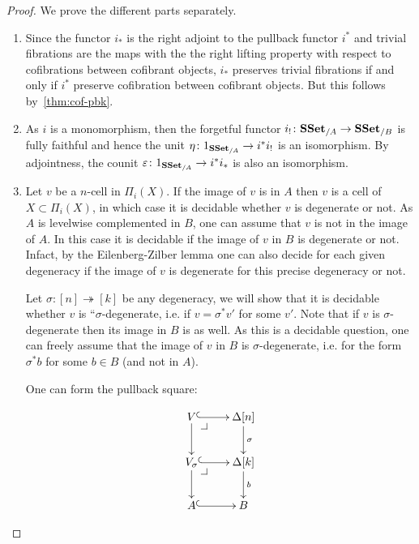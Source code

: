 \documentclass[reqno,10pt,a4paper,oneside,draft]{amsart}
\begin{document}
 
\begin{proof} We prove the different parts separately. 
\begin{enumerate}[$(i)$] 
\item 

Since the functor $i_*$ is the right adjoint to the pullback functor $i^*$ and trivial fibrations are the maps with the the right lifting property with respect to cofibrations between cofibrant objects, $i_*$ preserves trivial fibrations if and only if $i^*$ preserve cofibration between cofibrant objects. But this follows by~\cref{thm:cof-pbk}.

\item As $i$ is a monomorphism, then the forgetful functor $i_{!} \colon \mathbf{SSet}_{/A} \rightarrow \mathbf{SSet}_{/B}$ is fully faithful and hence the unit $\eta \colon 1_{\mathbf{SSet}_{/A}} \rightarrow i^* i_{!}$ is an isomorphism. By adjointness, the counit $\varepsilon \colon 1_{\mathbf{SSet}_{/A}} \rightarrow i^* i_*$ is also an isomorphism.

\item Let $v$ be a $n$-cell in $\Pi_i(X)$.
If the image of $v$ is in $A$ then $v$ is a cell of $X \subset \Pi_i(X)$, in which case it is decidable whether $v$ is degenerate or not.
As $A$ is levelwise complemented in $B$, one can assume that $v$ is not in the image of $A$. In this case it is decidable if the image of $v$ in $B$ is degenerate or not.
Infact, by the Eilenberg-Zilber lemma one can also decide for each given degeneracy if the image of $v$ is degenerate for this precise degeneracy or not. 

Let $\sigma:[n] \twoheadrightarrow [k]$ be any degeneracy, we will show that it is decidable whether $v$ is ``$\sigma$-degenerate, i.e. if $v =\sigma^* v'$ for some $v'$. Note that if $v$ is $\sigma$-degenerate then its image in $B$ is as well. As this is a decidable question, one can freely assume that the image of $v$ in $B$ is $\sigma$-degenerate, i.e. for the form $\sigma^* b$ for some $b \in B$ (and not in $A$).

 One can form the pullback square:


\[
\xymatrix{
V \ar@{^{(}->}[r] \drpullback \ar[d] & \Delta[n] \ar@{->}[d]^{\sigma} \\
V_{\sigma} \ar@{^{(}->}[r] \drpullback \ar[d] & \Delta[k] \ar@{->}[d]^b \\
A \ar@{^{(}->}[r] &  B }
\]


\end{enumerate}
\end{proof}
\end{document}
